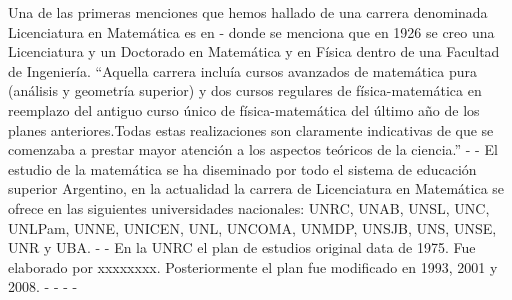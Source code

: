   Una de las primeras menciones que hemos hallado de una carrera denominada Licenciatura en Matemática es en  \cite{ortiz2011julio} 
- donde se menciona que en  1926 se creo una Licenciatura y un Doctorado en Matemática y en Física dentro de una Facultad de Ingeniería. ``Aquella carrera incluía cursos avanzados de matemática pura (análisis y geometría superior) y dos cursos regulares de física-matemática en reemplazo del antiguo curso único de física-matemática del último año de los planes anteriores.Todas estas realizaciones son claramente indicativas de que se comenzaba a prestar mayor  atención a los aspectos teóricos de la ciencia.''
-
- El estudio de la matemática se ha diseminado por todo el sistema de educación superior Argentino, en la actualidad la carrera de Licenciatura en Matemática se ofrece en las siguientes universidades nacionales: UNRC, UNAB, UNSL, UNC, UNLPam, UNNE, UNICEN, UNL, UNCOMA, UNMDP, UNSJB, UNS, UNSE, UNR y UBA.  
- 
- En la UNRC el plan de estudios original data de 1975. Fue elaborado por xxxxxxxx. Posteriormente el plan fue modificado en 1993, 2001 y 2008.  
- 
- 
- 
-
